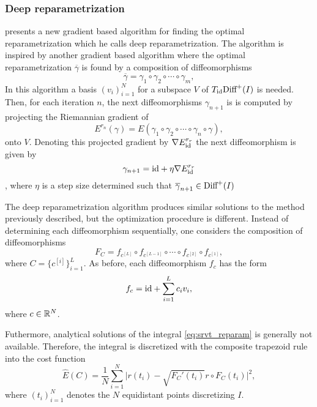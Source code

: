 \subsubsection{Deep reparametrization}
\citeauthor{jørgen2021} \cite{jørgen2021} presents a new gradient based algorithm for finding the optimal reparametrization which he calls deep reparametrization. The algorithm is inspired by another gradient based algorithm where the optimal reparametrization \(\overline \gamma\) is found by a composition of diffeomorphisms
\begin{equation*}
  \overline \gamma = \gamma_1 \circ \gamma_2 \circ \cdots  \circ \gamma_m,
\end{equation*}
In this algorithm a basis \({(v_i)}_{i=1}^{N}\) for a subspace \(V\) of \( T_{\text{id}}\text{Diff}^+(I)\) is needed. Then, for each iteration \(n\), the next diffeomorphisms \(\gamma_{n+1}\) is is computed by projecting the Riemannian gradient of
\begin{equation*}
  E^{r_n}(\gamma) = E(\gamma_1 \circ \gamma_2 \circ \cdots  \circ \gamma_n \circ \gamma),
\end{equation*}
onto \(V\). Denoting this projected gradient by \(\nabla E_{\text{id}}^{r_r}\) the next diffeomorphism is given by
\begin{equation*}
  \gamma_{n+1} = \text{id} + \eta \nabla E_{\text{id}}^{r_r}
\end{equation*}
, where \(\eta\) is a step size determined such that \(\overline \gamma_{n+1} \in \text{Diff}^+(I)\)

The deep reparametrization algorithm produces similar solutions to the method previously described, but the optimization procedure is different. Instead of determining each diffeomorphism sequentially, one considers the composition of diffeomorphisms
\begin{equation*}
  F_{C} = f_{c^{[L]}}\circ f_{c^{[L-1]}} \circ \cdots \circ f_{c^{[2]}} \circ f_{c^{[1]}},
\end{equation*}
where \(C = \{c^{[i]}\}^{L}_{i=1}\). As before, each diffeomorphism \(f_{c}\) has the form
\begin{equation*}
  f_{c}= \text{id} +  \sum_{i=1}^{L} c_i v_i,
\end{equation*}
where \(c \in \mathbb{R}^N \).

Futhermore, analytical solutions of the integral \eqref{eq:srvt_reparam} is generally not available. Therefore, the integral is discretized with the composite trapezoid rule into the cost function
\begin{equation}\label{eq:discretized_cost}
  \hat E(C) = \frac{1}{N} \sum_{i = 1}^N {\vert r(t_i)- \sqrt{ F_C'(t_i)}r \circ F_C(t_i) \vert^2},
\end{equation}
where \({(t_i)}_{i=1}^N\) denotes the \(N\) equidistant points discretizing \(I\).

